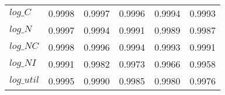 \begin{center}
\begin{longtable}{lccccc}
$log\_C     $	 & 	     0.9998	 & 	     0.9997	 & 	     0.9996	 & 	     0.9994	 & 	     0.9993 \\ 
$log\_N     $	 & 	     0.9997	 & 	     0.9994	 & 	     0.9991	 & 	     0.9989	 & 	     0.9987 \\ 
$log\_NC    $	 & 	     0.9998	 & 	     0.9996	 & 	     0.9994	 & 	     0.9993	 & 	     0.9991 \\ 
$log\_NI    $	 & 	     0.9991	 & 	     0.9982	 & 	     0.9973	 & 	     0.9966	 & 	     0.9958 \\ 
$log\_util  $	 & 	     0.9995	 & 	     0.9990	 & 	     0.9985	 & 	     0.9980	 & 	     0.9976 \\ 
\end{longtable}
 \end{center}
